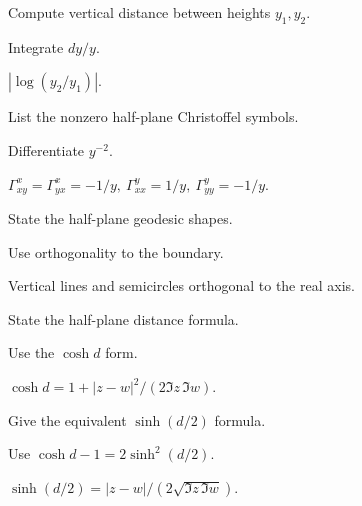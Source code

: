\begin{exercise}\label{exr:vii32-05}
Compute vertical distance between heights \(y_1,y_2\).
\end{exercise}
\begin{hint}
Integrate \(dy/y\).
\end{hint}
\begin{solution}
\(|\log(y_2/y_1)|\).
\end{solution}

\begin{exercise}\label{exr:vii32-06}
List the nonzero half-plane Christoffel symbols.
\end{exercise}
\begin{hint}
Differentiate \(y^{-2}\).
\end{hint}
\begin{solution}
\(\Gamma^x_{xy}=\Gamma^x_{yx}=-1/y,\ \Gamma^y_{xx}=1/y,\ \Gamma^y_{yy}=-1/y\).
\end{solution}

\begin{exercise}\label{exr:vii32-07}
State the half-plane geodesic shapes.
\end{exercise}
\begin{hint}
Use orthogonality to the boundary.
\end{hint}
\begin{solution}
Vertical lines and semicircles orthogonal to the real axis.
\end{solution}

\begin{exercise}\label{exr:vii32-08}
State the half-plane distance formula.
\end{exercise}
\begin{hint}
Use the \(\cosh d\) form.
\end{hint}
\begin{solution}
\(\cosh d=1+|z-w|^2/(2\Im z\,\Im w)\).
\end{solution}

\begin{exercise}\label{exr:vii32-09}
Give the equivalent \(\sinh(d/2)\) formula.
\end{exercise}
\begin{hint}
Use \(\cosh d-1=2\sinh^2(d/2)\).
\end{hint}
\begin{solution}
\(\sinh(d/2)=|z-w|/(2\sqrt{\Im z\,\Im w})\).
\end{solution}

